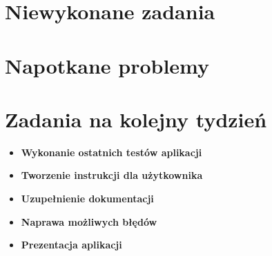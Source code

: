 \documentclass[12pt,a4paper]{mwart}
\begin{document}
\section{Niewykonane zadania}

\section{Napotkane problemy}

\section{Zadania na kolejny tydzień}
\begin{itemize}
		\item \textbf{Wykonanie ostatnich testów aplikacji }
		\item \textbf{Tworzenie instrukcji dla użytkownika }
		\item \textbf{Uzupełnienie dokumentacji  }
		\item \textbf{Naprawa możliwych błędów }
		\item \textbf{Prezentacja aplikacji}
\end{itemize}
\end{document}
